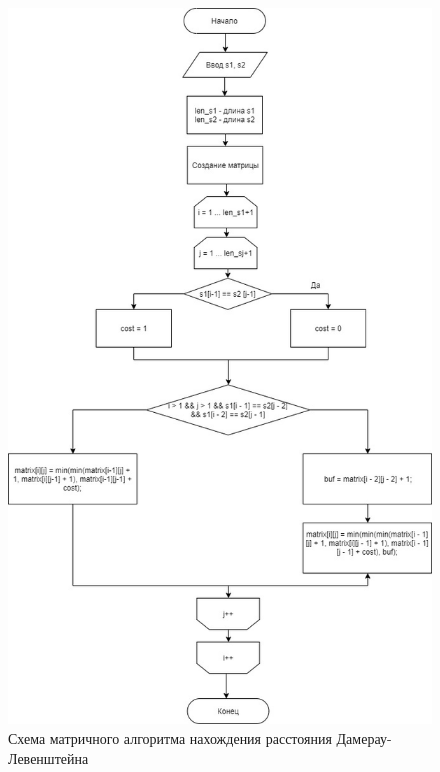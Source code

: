 \documentclass[12pt]{report}
\begin{document}
\begin{figure}[h]
\centering
\includegraphics[width=0.75\linewidth]{MatrixDL.jpg}
\caption{Схема матричного алгоритма нахождения расстояния Дамерау-Левенштейна}
\label{fig:mpr}
\end{figure}
\end{document}

